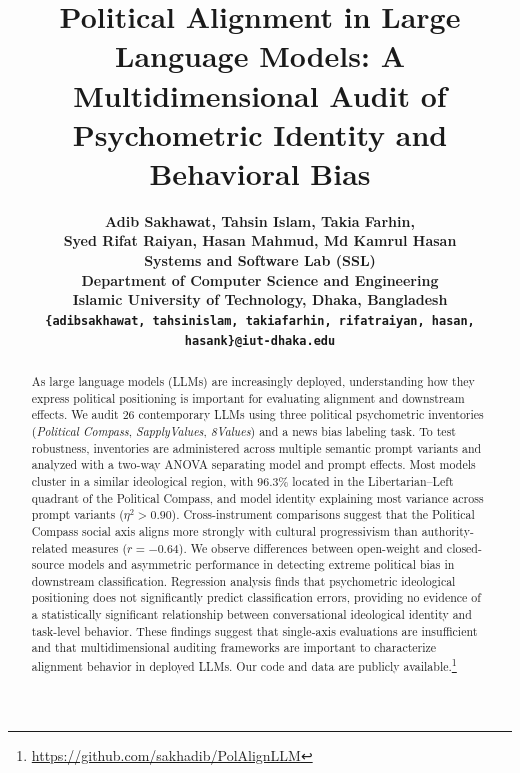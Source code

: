 \documentclass[11pt]{article}
\title{Political Alignment in Large Language Models:
A Multidimensional Audit of Psychometric Identity and Behavioral Bias}
\author{\bf Adib Sakhawat, 
{\bf Tahsin Islam,}
{\bf Takia Farhin,}\\
{\bf Syed Rifat Raiyan,} 
{\bf Hasan Mahmud,}
{\bf Md Kamrul Hasan}\\
Systems and Software Lab (SSL)\\Department of Computer Science and Engineering\\
Islamic University of Technology, Dhaka, Bangladesh\\
\texttt{\small\{adibsakhawat, tahsinislam, takiafarhin, rifatraiyan, hasan, hasank\}@iut-dhaka.edu}\\
}
\begin{document}
\maketitle

\begin{abstract}

As large language models (LLMs) are increasingly deployed, understanding how they express political positioning is important for evaluating alignment and downstream effects. We audit 26 contemporary LLMs using three political psychometric inventories (\textit{Political Compass}, \textit{SapplyValues}, \textit{8Values}) and a news bias labeling task. To test robustness, inventories are administered across multiple semantic prompt variants and analyzed with a two-way ANOVA separating model and prompt effects. Most models cluster in a similar ideological region, with $96.3\%$ located in the Libertarian--Left quadrant of the Political Compass, and model identity explaining most variance across prompt variants ($\eta^2 > 0.90$). Cross-instrument comparisons suggest that the Political Compass social axis aligns more strongly with cultural progressivism than authority-related measures ($r=-0.64$). We observe differences between open-weight and closed-source models and asymmetric performance in detecting extreme political bias in downstream classification. Regression analysis finds that psychometric ideological positioning does not significantly predict classification errors, providing no evidence of a statistically significant relationship between conversational ideological identity and task-level behavior. These findings suggest that single-axis evaluations are insufficient and that multidimensional auditing frameworks are important to characterize alignment behavior in deployed LLMs. Our code and data are publicly available.\footnote{\url{https://github.com/sakhadib/PolAlignLLM}}

\end{abstract}
\end{document}
